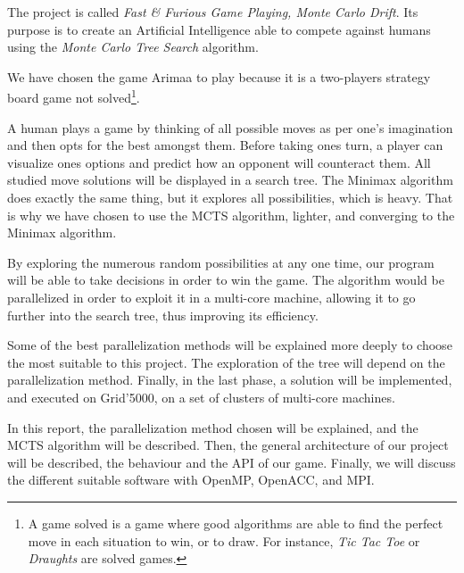 The project is called \emph{Fast \& Furious Game Playing, Monte Carlo Drift}. Its purpose is to create an Artificial Intelligence able to compete against humans using the \emph{Monte Carlo Tree Search} algorithm.

We have chosen the game Arimaa to play because it is a two-players strategy board game not solved\footnote{A game solved is a game where good algorithms are able to find the perfect move in each situation to win, or to draw. For instance, \textit{Tic Tac Toe} or \textit{Draughts} are solved games.}.

A human plays a game by thinking of all possible moves as per one's imagination and then opts for the best amongst them. Before taking ones turn, a player can visualize ones options and predict how an opponent will counteract them. All studied move solutions will be displayed in a search tree. The Minimax algorithm does exactly the same thing, but it explores all possibilities, which is heavy. That is why we have chosen to use the MCTS algorithm, lighter, and converging to the Minimax algorithm.

By exploring the numerous random possibilities at any one time, our program will be able to take decisions in order to win the game.
The algorithm would be parallelized in order to exploit it in a multi-core machine, allowing it to go further into the search tree, thus improving its efficiency.

Some of the best parallelization methods will be explained more deeply to choose the most suitable to this project.
The exploration of the tree will depend on the parallelization method.
Finally, in the last phase, a solution will be implemented, and executed on Grid'5000, on a set of clusters of multi-core machines.


In this report, the parallelization method chosen will be explained, and the MCTS algorithm will be described.
Then, the general architecture of our project will be described, the behaviour and the API of our game.
Finally, we will discuss the different suitable software with OpenMP, OpenACC, and MPI.
